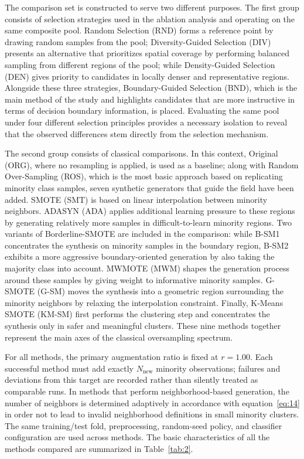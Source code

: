 \documentclass[pdflatex]{sn-jnl}
\begin{document}
The comparison set is constructed to serve two different purposes. The first group consists of selection strategies used in the ablation analysis and operating on the same composite pool. Random Selection (RND) forms a reference point by drawing random samples from the pool; Diversity-Guided Selection (DIV) presents an alternative that prioritizes spatial coverage by performing balanced sampling from different regions of the pool; while Density-Guided Selection (DEN) gives priority to candidates in locally denser and representative regions. Alongside these three strategies, Boundary-Guided Selection (BND), which is the main method of the study and highlights candidates that are more instructive in terms of decision boundary information, is placed. Evaluating the same pool under four different selection principles provides a necessary isolation to reveal that the observed differences stem directly from the selection mechanism.

The second group consists of classical comparisons. In this context, Original (ORG), where no resampling is applied, is used as a baseline; along with Random Over-Sampling (ROS), which is the most basic approach based on replicating minority class samples, seven synthetic generators that guide the field have been added. SMOTE (SMT) is based on linear interpolation between minority neighbors. ADASYN (ADA) applies additional learning pressure to these regions by generating relatively more samples in difficult-to-learn minority regions. Two variants of Borderline-SMOTE are included in the comparison: while B-SM1 concentrates the synthesis on minority samples in the boundary region, B-SM2 exhibits a more aggressive boundary-oriented generation by also taking the majority class into account. MWMOTE (MWM) shapes the generation process around these samples by giving weight to informative minority samples. G-SMOTE (G-SM) moves the synthesis into a geometric region surrounding the minority neighbors by relaxing the interpolation constraint. Finally, K-Means SMOTE (KM-SM) first performs the clustering step and concentrates the synthesis only in safer and meaningful clusters. These nine methods together represent the main axes of the classical oversampling spectrum.

For all methods, the primary augmentation ratio is fixed at \(r=1.00\). Each successful method must add exactly \(N_{\text{new}}\) minority observations; failures and deviations from this target are recorded rather than silently treated as comparable runs. In methods that perform neighborhood-based generation, the number of neighbors is determined adaptively in accordance with equation~\eqref{eq:14} in order not to lead to invalid neighborhood definitions in small minority clusters. The same training/test fold, preprocessing, random-seed policy, and classifier configuration are used across methods. The basic characteristics of all the methods compared are summarized in Table~\ref{tab:2}.
\end{document}

